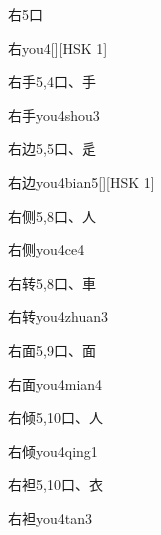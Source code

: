 \begin{entry}{右}{5}{⼝}
  \begin{phonetics}{右}{you4}[][HSK 1]
  \end{phonetics}
\end{entry}

\begin{entry}{右手}{5,4}{⼝、⼿}
  \begin{phonetics}{右手}{you4shou3}
  \end{phonetics}
\end{entry}

\begin{entry}{右边}{5,5}{⼝、⾡}
  \begin{phonetics}{右边}{you4bian5}[][HSK 1]
  \end{phonetics}
\end{entry}

\begin{entry}{右侧}{5,8}{⼝、⼈}
  \begin{phonetics}{右侧}{you4ce4}
  \end{phonetics}
\end{entry}

\begin{entry}{右转}{5,8}{⼝、⾞}
  \begin{phonetics}{右转}{you4zhuan3}
  \end{phonetics}
\end{entry}

\begin{entry}{右面}{5,9}{⼝、⾯}
  \begin{phonetics}{右面}{you4mian4}
  \end{phonetics}
\end{entry}

\begin{entry}{右倾}{5,10}{⼝、⼈}
  \begin{phonetics}{右倾}{you4qing1}
  \end{phonetics}
\end{entry}

\begin{entry}{右袒}{5,10}{⼝、⾐}
  \begin{phonetics}{右袒}{you4tan3}
  \end{phonetics}
\end{entry}

